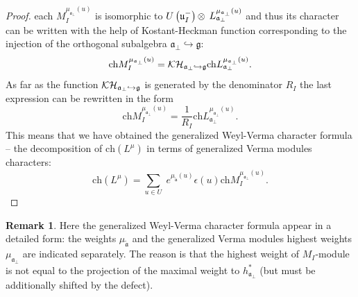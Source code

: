 \documentclass[12pt]{article}
\theoremstyle{definition}
\newtheorem{remark}{Remark}
\newcommand{\gf}{\mathfrak{g}}
\newcommand{\aft}{\widetilde{\mathfrak{a}}}
\newcommand{\afb}{\mathfrak{a}_{\bot}}
\begin{document}
\begin{proof}
each $M_{I}^{\mu _{\afb}\left( u\right) }$ is isomorphic to $%
U\left( \frak{u}_{I}^{-}\right) \otimes $ $L_{\afb}^{\mu _{%
\afb}\left( u\right) }$ and thus its character can be written
with the help of Kostant-Heckman function \cite{KostantHeckman1982} corresponding
to the injection of the orthogonal subalgebra $\afb\hookrightarrow \gf$:
\begin{equation*}
\mathrm{ch}M_{I}^{\mu _{\afb}\left( u\right) }=\mathcal{KH}_{%
\afb\hookrightarrow \gf}\mathrm{ch}L_{\afb}^{\mu _{\afb}\left( u\right) }.
\end{equation*}
As far as the function $\mathcal{KH}_{\afb\hookrightarrow \frak{%
g}}$ is generated by the denominator $R_{I}$ the last expression can be
rewritten in the form
\begin{equation*}
\mathrm{ch}M_{I}^{\mu _{\afb}\left( u\right) }=\frac{1}{R_{I}}%
\mathrm{ch}L_{\afb}^{\mu _{\afb}\left( u\right) }.
\end{equation*}
This means that we have obtained the generalized Weyl-Verma character formula
-- the decomposition of $\mathrm{ch}\left(
L^{\mu }\right) $ in terms of generalized Verma modules characters:
\begin{equation}
\mathrm{ch}\left( L^{\mu }\right) =\sum_{u\in U}\;e^{\mu _{\aft}\left(
u\right) }\epsilon (u)\mathrm{ch}M_{I}^{\mu _{\afb}\left(
u\right) }.  \label{char in gen verma mod}
\end{equation}
\end{proof}

\begin{remark}
Here the generalized Weyl-Verma character formula appear in a detailed
form: the weights $\mu _{\aft}$ and the generalized Verma modules highest weights
$\mu _{\afb}$ are indicated separately. The reason is that the
highest weight of $M_{I}$-module is not equal to the projection of the maximal
weight to $h^*_{\afb}$ (but must be additionally shifted by the defect).
\end{remark}
\end{document}
